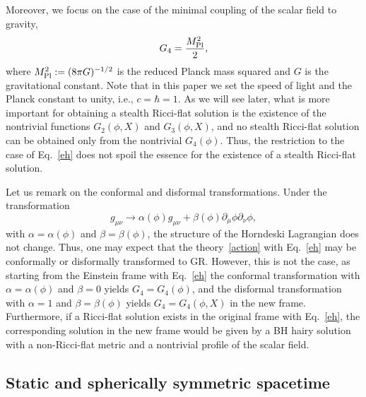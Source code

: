 \documentclass[prd,amsmath,amssymb,floatfix,superscriptaddress,notitlepage,nofootinbib,preprintnumbers]{revtex4-1}
\newcommand{\be}{\begin{equation}}
\newcommand{\ee}{\end{equation}}
\newcommand{\Mpl}{M_{\rm Pl}}
\newcommand{\pa}{\partial}
\begin{document}
Moreover, 
we focus on the case of the minimal coupling of the scalar field
to gravity,
\begin{align}
\label{eh}
G_4=\frac{\Mpl^2}{2},
\end{align}
where $\Mpl^2:=(8\pi G)^{-1/2}$ is the reduced Planck mass squared
and $G$ is the gravitational constant.
Note that 
in this paper we set the speed of light and the Planck constant to unity,
i.e., $c=\hbar=1$.
As we will see later,
what is more important for obtaining a stealth Ricci-flat solution
is the existence of the nontrivial functions $G_2(\phi,X)$ and $G_3(\phi,X)$,
and no stealth Ricci-flat solution can be obtained 
only from the nontrivial $G_4(\phi)$.
Thus, 
the restriction to the case of Eq.~\eqref{eh} 
does not spoil the essence for the existence 
of a stealth Ricci-flat solution.


Let us remark on the conformal and disformal transformations.
Under the transformation
\be g_{\mu\nu} \to \alpha(\phi) g_{\mu\nu} + \beta(\phi)\pa_\mu\phi\pa_\nu\phi, \ee
with $\alpha=\alpha(\phi)$ and $\beta=\beta(\phi)$, 
the structure of the Horndeski Lagrangian does not change. 
Thus, one may expect that 
the theory~\eqref{action} with Eq.~\eqref{eh} 
may be conformally or disformally transformed to GR.
However, 
this is not the case,
as starting from the Einstein frame with Eq.~\eqref{eh}
the conformal transformation with $\alpha=\alpha(\phi)$ and $\beta=0$ 
yields $G_4=G_4(\phi)$,
and the disformal transformation with $\alpha=1$ and $\beta=\beta(\phi)$ 
yields $G_4=G_4(\phi,X)$ in the new frame.
Furthermore,
if a Ricci-flat solution exists in the original frame with Eq.~\eqref{eh},
the corresponding solution in the new frame
would be given by a BH hairy solution
with a non-Ricci-flat metric
and a nontrivial profile of the scalar field.


\subsection{Static and spherically symmetric spacetime}
\label{sec23}
\end{document}
